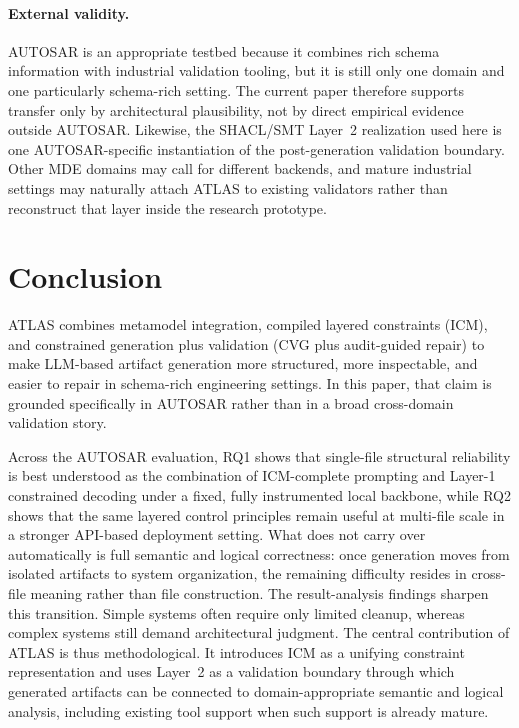 \documentclass[acmlarge,nonacm]{acmart}
\theoremstyle{acmplain}
\theoremstyle{acmdefinition}
\begin{document}
\paragraph{External validity.} AUTOSAR is an appropriate testbed because it combines rich schema information with industrial validation tooling, but it is still only one domain and one particularly schema-rich setting. The current paper therefore supports transfer only by architectural plausibility, not by direct empirical evidence outside AUTOSAR. Likewise, the SHACL/SMT Layer~2 realization used here is one AUTOSAR-specific instantiation of the post-generation validation boundary. Other MDE domains may call for different backends, and mature industrial settings may naturally attach ATLAS to existing validators rather than reconstruct that layer inside the research prototype.


\section{Conclusion}
\label{sec:conclusion}
\label{sec:concl}
ATLAS combines metamodel integration, compiled layered constraints (ICM), and constrained generation plus validation (CVG plus audit-guided repair) to make LLM-based artifact generation more structured, more inspectable, and easier to repair in schema-rich engineering settings. In this paper, that claim is grounded specifically in AUTOSAR rather than in a broad cross-domain validation story.

Across the AUTOSAR evaluation, RQ1 shows that single-file structural reliability is best understood as the combination of ICM-complete prompting and Layer-1 constrained decoding under a fixed, fully instrumented local backbone, while RQ2 shows that the same layered control principles remain useful at multi-file scale in a stronger API-based deployment setting. What does not carry over automatically is full semantic and logical correctness: once generation moves from isolated artifacts to system organization, the remaining difficulty resides in cross-file meaning rather than file construction. The result-analysis findings sharpen this transition. Simple systems often require only limited cleanup, whereas complex systems still demand architectural judgment. The central contribution of ATLAS is thus methodological. It introduces ICM as a unifying constraint representation and uses Layer~2 as a validation boundary through which generated artifacts can be connected to domain-appropriate semantic and logical analysis, including existing tool support when such support is already mature.
\end{document}
